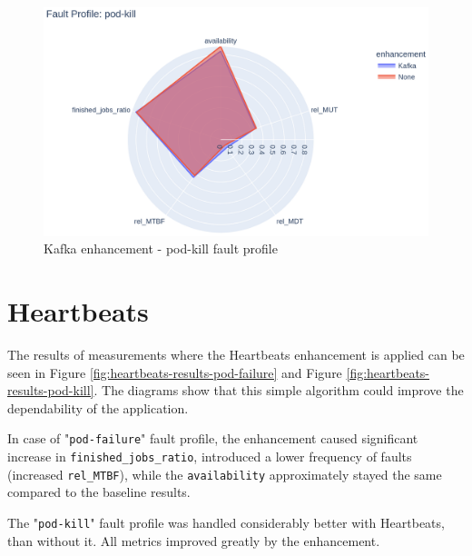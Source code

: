 \begin{figure}[h]
	\centering
	\includegraphics[width=140mm, keepaspectratio]{figures/kafka_with_base_pod-kill.png}
	\caption{Kafka enhancement - pod-kill fault profile}
	\label{fig:kafka-results-pod-kill}
\end{figure}


\section{Heartbeats}

The results of measurements where the Heartbeats enhancement is applied can be seen in Figure \ref{fig:heartbeats-results-pod-failure} and Figure \ref{fig:heartbeats-results-pod-kill}. The diagrams show that this simple algorithm could improve the dependability of the application.

In case of "\texttt{pod-failure}" fault profile, the enhancement caused significant increase in \texttt{finished\_jobs\_ratio}, introduced a lower frequency of faults (increased \texttt{rel\_MTBF}), while the \texttt{availability} approximately stayed the same compared to the baseline results.

The "\texttt{pod-kill}" fault profile was handled considerably better with Heartbeats, than without it. All metrics improved greatly by the enhancement.

